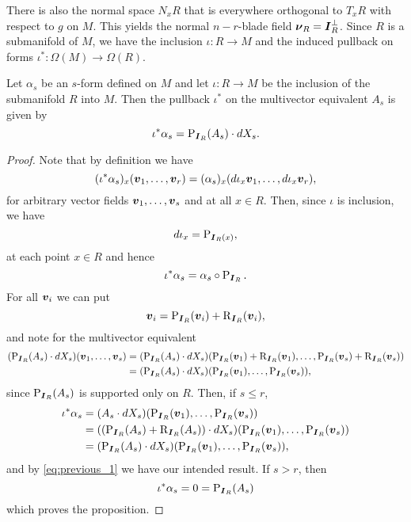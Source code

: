 There is also the normal space $N_x R$ that is everywhere orthogonal to $T_x R$ with respect to $g$ on $M$. This yields the normal $n-r$-blade field $\boldsymbol{\nu}_R = \boldsymbol{I}_R^\perp$. Since $R$ is a submanifold of $M$, we have the inclusion $\iota \colon R \to M$ and the induced pullback on forms $\iota^* \colon \Omega(M) \to \Omega(R)$. 
\begin{proposition}
Let $\alpha_s$ be an $s$-form defined on $M$ and let $\iota \colon R \to M$ be the inclusion of the submanifold $R$ into $M$. Then the pullback $\iota^*$ on the multivector equivalent $A_s$ is given by
\begin{equation}
\iota^* \alpha_s = \operatorname{P}_{\boldsymbol{I}_R}(A_s) \cdot dX_s.
\end{equation}
\end{proposition}
\begin{proof}
Note that by definition we have
\[
(\iota^* \alpha_s)_x (\boldsymbol{v}_1,\dots,\boldsymbol{v}_r) = (\alpha_s)_x(d\iota_x\boldsymbol{v}_1,\dots, d\iota_x\boldsymbol{v}_r ),
\]
for arbitrary vector fields $\boldsymbol{v}_1,\dots,\boldsymbol{v}_s$ and at all $x\in R$. Then, since $\iota$ is inclusion, we have
\[
d\iota_x = \operatorname{P}_{\boldsymbol{I}_R(x)},
\]
at each point $x \in R$ and hence
\[
\iota^* \alpha_s = \alpha_s \circ \operatorname{P}_{\boldsymbol{I}_R}.
\]
For all $\boldsymbol{v}_i$ we can put
\[
\boldsymbol{v}_i = \operatorname{P}_{\boldsymbol{I}_R}(\boldsymbol{v}_i) + \operatorname{R}_{\boldsymbol{I}_R}(\boldsymbol{v}_i),
\]
and note for the multivector equivalent
\begin{align}
\label{eq:previous_1}
(\operatorname{P}_{\boldsymbol{I}_R}(A_s) \cdot dX_s)(\boldsymbol{v}_1,\dots,\boldsymbol{v}_s) &= (\operatorname{P}_{\boldsymbol{I}_R}(A_s) \cdot dX_s)(\operatorname{P}_{\boldsymbol{I}_R}(\boldsymbol{v}_1) + \operatorname{R}_{\boldsymbol{I}_R}(\boldsymbol{v}_1),\dots,\operatorname{P}_{\boldsymbol{I}_R}(\boldsymbol{v}_s) + \operatorname{R}_{\boldsymbol{I}_R}(\boldsymbol{v}_s))\\
&= (\operatorname{P}_{\boldsymbol{I}_R}(A_s) \cdot dX_s)(\operatorname{P}_{\boldsymbol{I}_R}(\boldsymbol{v}_1),\dots,\operatorname{P}_{\boldsymbol{I}_R}(\boldsymbol{v}_s)),
\end{align}
since $\operatorname{P}_{\boldsymbol{I}_R}(A_s)$ is supported only on $R$. Then, if $s\leq r$,
\begin{align*}
\iota^*\alpha_s &= (A_s \cdot dX_s)(\operatorname{P}_{\boldsymbol{I}_R}(\boldsymbol{v}_1),\dots,\operatorname{P}_{\boldsymbol{I}_R}(\boldsymbol{v}_s))\\
&= ((\operatorname{P}_{\boldsymbol{I}_R}(A_s) + \operatorname{R}_{\boldsymbol{I}_R}(A_s)) \cdot dX_s)(\operatorname{P}_{\boldsymbol{I}_R}(\boldsymbol{v}_1),\dots,\operatorname{P}_{\boldsymbol{I}_R}(\boldsymbol{v}_s))\\
&= (\operatorname{P}_{\boldsymbol{I}_R}(A_s) \cdot dX_s)(\operatorname{P}_{\boldsymbol{I}_R}(\boldsymbol{v}_1),\dots,\operatorname{P}_{\boldsymbol{I}_R}(\boldsymbol{v}_s)),
\end{align*}
and by \cref{eq:previous_1} we have our intended result. If $s>r$, then 
\[
\iota^* \alpha_s = 0 = \operatorname{P}_{\boldsymbol{I}_R}(A_s)
\]
which proves the proposition.
\end{proof}

